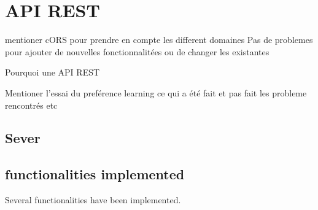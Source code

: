 \section{API REST}
 mentioner cORS pour prendre en compte les different domaines
 Pas de problemes pour ajouter de nouvelles fonctionnalitées ou de changer les existantes
 
 Pourquoi une API REST
 
 Mentioner l'essai du preférence learning ce qui a été fait et pas fait les probleme rencontrés etc
\subsection{Sever}
\subsection{functionalities implemented}
Several functionalities have been implemented.
